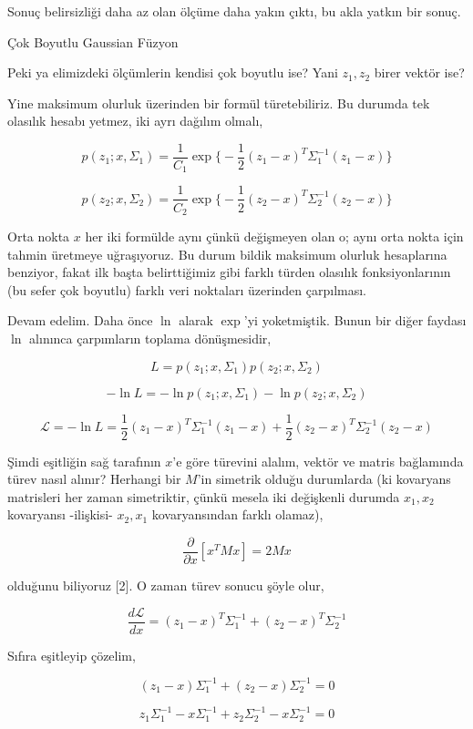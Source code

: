 \documentclass[12pt,fleqn]{article}\usepackage{../../common}
\begin{document}
Sonuç belirsizliği daha az olan ölçüme daha yakın çıktı, bu akla yatkın
bir sonuç.

Çok Boyutlu Gaussian Füzyon

Peki ya elimizdeki ölçümlerin kendisi çok boyutlu ise? Yani $z_1,z_2$ birer
vektör ise?

Yine maksimum olurluk üzerinden bir formül türetebiliriz. Bu durumda tek
olasılık hesabı yetmez, iki ayrı dağılım olmalı,

$$ p(z_1;x,\Sigma_1) =  \frac{ 1}{C_1} \exp 
\bigg\{ 
-\frac{ 1}{2}(z_1-x)^T\Sigma_1^{-1}(z_1-x)
\bigg\} $$

$$ p(z_2;x,\Sigma_2) =  \frac{ 1}{C_2} \exp 
\bigg\{ 
-\frac{ 1}{2}(z_2-x)^T\Sigma_2^{-1}(z_2-x)
\bigg\} $$

Orta nokta $x$ her iki formülde aynı çünkü değişmeyen olan o; aynı orta
nokta için tahmin üretmeye uğraşıyoruz. Bu durum bildik maksimum olurluk
hesaplarına benziyor, fakat ilk başta belirttiğimiz gibi farklı türden
olasılık fonksiyonlarının (bu sefer çok boyutlu) farklı veri noktaları
üzerinden çarpılması.

Devam edelim. Daha önce $\ln$ alarak $\exp$'yi yoketmiştik. Bunun bir diğer
faydası $\ln$ alınınca çarpımların toplama dönüşmesidir, 

$$ L = p(z_1;x,\Sigma_1) p(z_2;x,\Sigma_2) 
$$

$$ -\ln L = -\ln p(z_1;x,\Sigma_1) -\ln p(z_2;x,\Sigma_2) 
$$

$$ 
\mathcal{L} = 
-\ln L = 
\frac{ 1}{2}(z_1-x)^T\Sigma_1^{-1}(z_1-x) + 
\frac{ 1}{2}(z_2-x)^T\Sigma_2^{-1}(z_2-x)
$$

Şimdi eşitliğin sağ tarafının $x$'e göre türevini alalım, vektör ve matris
bağlamında türev nasıl alınır? Herhangi bir $M$'in simetrik olduğu
durumlarda (ki kovaryans matrisleri her zaman simetriktir, çünkü mesela iki
değişkenli durumda $x_1,x_2$ kovaryansı -ilişkisi- $x_2,x_1$ kovaryansından
farklı olamaz),

$$ \frac{\partial}{\partial x}[x^TMx] = 2Mx $$

olduğunu biliyoruz [2]. O zaman türev sonucu şöyle olur, 

$$ 
\frac{d\mathcal{L}}{dx} = 
(z_1-x)^T\Sigma_1^{-1} +  (z_2-x)^T\Sigma_2^{-1}
$$

Sıfıra eşitleyip çözelim, 

$$ 
(z_1-x)\Sigma_1^{-1} +  (z_2-x)\Sigma_2^{-1} = 0
$$

$$ 
z_1\Sigma_1^{-1} - x\Sigma_1^{-1} + z_2\Sigma_2^{-1} - x\Sigma_2^{-1} = 0
$$
\end{document}
